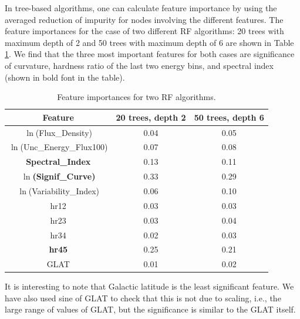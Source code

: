 In tree-based algorithms, one can calculate feature importance by using the averaged reduction of impurity for nodes involving the different features. 
The feature importances for the case of two different RF algorithms: 20 trees with maximum depth of 2 and 50 trees with maximum depth of 6 are shown in Table \ref{tab:feat_imp}.
We find that the three most important features for both cases are significance of curvature, hardness ratio of the last two energy bins, and spectral index (shown in bold font in the table).


\begin{table}[!h]
    \tiny
    \centering
    \renewcommand{\tabcolsep}{1mm}
\renewcommand{\arraystretch}{1}

    \begin{tabular}{|c|c|c|}
    \hline
    Feature &  20 trees, depth 2& 50 trees, depth 6\\
    \hline
    $\ln$(Flux\_Density) & 0.04 & 0.05        \\
    \hline
    $\ln$(Unc\_Energy\_Flux100) & 0.07     & 0.08 \\
    \hline %
   {\bf Spectral\_Index} & 0.13     &   0.11\\
    \hline %
    {\bf $\ln$(Signif\_Curve)} & 0.33 &0.29  \\
    \hline
   $\ln$(Variability\_Index)&  0.06   &  0.10  \\
    \hline %
    hr12& 0.03 &0.03 \\
    \hline
     hr23& 0.03 &0.04 \\
    \hline
    hr34& 0.02 &0.03 \\
    \hline
   {\bf hr45} & 0.25 &0.21 \\
    \hline
    GLAT&0.01&0.02\\
    \hline
    \end{tabular}
    \vspace{0.4cm}
    \caption{Feature importances for two RF algorithms.}
    \label{tab:feat_imp}
\end{table}

It is interesting to note that Galactic latitude is the least significant feature.
We have also used sine of GLAT to check that this is not due to scaling, i.e., the large range of values of GLAT,
but the significance is similar to the GLAT itself.

